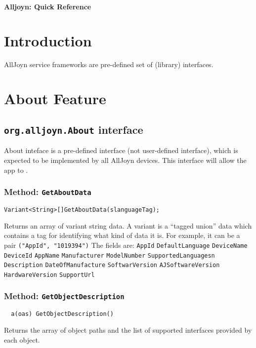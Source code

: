 \documentclass{note}
\begin{document}
\small


\begin{center}
{\large\bf Alljoyn: Quick Reference}
\end{center}

\vspace*{1cm}

\tableofcontents

\pagebreak

\section{Introduction}
AllJoyn service frameworks are pre-defined set of (library) interfaces.



\section{About Feature}
\subsection{{\bfseries{}\texttt{org.alljoyn.About}} interface}
About inteface is a pre-defined interface (not user-defined interface),
which is expected to be implemented by all AllJoyn devices.
This interface will allow the app to . 

\subsubsection{Method: {\bf\texttt{GetAboutData}}}
  \begin{alltt}
  Variant<String>[] GetAboutData(s languageTag);
  \end{alltt}
Returns an array of variant string data. A variant is a ``tagged union'' data
which contains  a tag for identifying what kind of data it is. For example, it
can be a pair \verb+("AppId", "1019394")+
The fields are:
\bit
       \w \verb+AppId+
       \w \verb+DefaultLanguage+
       \w \verb+DeviceName+
       \w \verb+DeviceId+
       \w \verb+AppName+
       \w \verb+Manufacturer+
       \w \verb+ModelNumber+
       \w \verb+SupportedLanguagesn+
       \w \verb+Description+
       \w \verb+DateOfManufacture+
       \w \verb+SoftwarVersion+
       \w \verb+AJSoftwareVersion+
       \w \verb+HardwareVersion+
       \w \verb+SupportUrl+
       \eit

\subsubsection{Method: {\bf\texttt{GetObjectDescription}}}
\begin{verbatim}
  a(oas) GetObjectDescription()
\end{verbatim}
Returns the array of object paths
   and the list of supported interfaces provided by each object.
\end{document}
